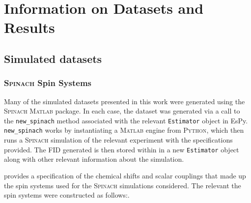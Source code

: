 \chapter{Information on Datasets and Results}
\label{chap:datasets}

\section{Simulated datasets}
\label{sec:simulated-datasets}

\subsection{\textsc{Spinach} Spin Systems}
Many of the simulated datasets presented in this work were generated using the
\textsc{Spinach} \textsc{Matlab} package\cite{Hogben2011}.
In each case, the dataset was generated via a call to the \texttt{new\_spinach}
method associated with the relevant \texttt{Estimator} object in \ac{EsPy}.
\texttt{new\_spinach} works by instantiating a \textsc{Matlab} engine from
\textsc{Python}\cite{MatlabEngine}, which then runs a \textsc{\textsc{Spinach}}
simulation of the relevant experiment with the specifications provided. The
\ac{FID} generated is then stored within in a new \texttt{Estimator} object
along with other relevant information about the simulation.

 provides a specification of the chemical
shifts and scalar couplings that made up the spin systems used for the
\textsc{Spinach} simulations considered.
The relevant the spin systems were constructed as follows:.
